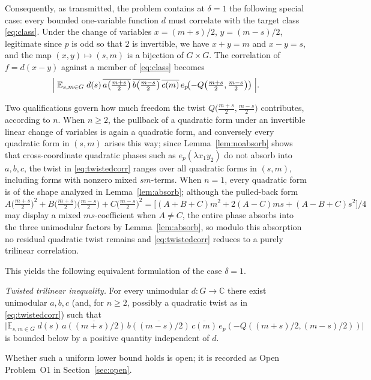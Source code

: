 \documentclass[11pt]{article}
\theoremstyle{remark}
\begin{document}
Consequently, as transmitted, the problem contains at $\delta=1$ the
following special case: every bounded one-variable function $d$ must
correlate with the target class \eqref{eq:class}. Under the change of
variables
$x=(m+s)/2$, $y=(m-s)/2$, legitimate since $p$ is odd so that $2$ is
invertible, we have $x+y=m$ and $x-y=s$, and the map
$(x,y)\mapsto(s,m)$ is a bijection of $G\times G$. The correlation of
$f=d(x-y)$ against a member of \eqref{eq:class} becomes
\begin{equation}\label{eq:twistedcorr}
\Bigl|\;
\mathbb{E}_{s,m\in G}\;
d(s)\,
\overline{a\bigl(\tfrac{m+s}{2}\bigr)}\,
\overline{b\bigl(\tfrac{m-s}{2}\bigr)}\,
\overline{c(m)}\,
e_p\!\bigl(-Q\bigl(\tfrac{m+s}{2},\tfrac{m-s}{2}\bigr)\bigr)
\;\Bigr|.
\end{equation}

Two qualifications govern how much freedom the twist
$Q\bigl(\tfrac{m+s}{2},\tfrac{m-s}{2}\bigr)$ contributes, according to $n$.
When $n\ge2$, the pullback of a quadratic form under an invertible linear
change of variables is again a quadratic form, and conversely every
quadratic form in $(s,m)$ arises this way; since
Lemma~\ref{lem:noabsorb} shows that cross-coordinate quadratic phases such
as $e_p(\lambda x_1y_2)$ do not absorb into $a,b,c$, the twist in
\eqref{eq:twistedcorr} ranges over all quadratic forms in $(s,m)$, including
forms with nonzero mixed $sm$-terms. When $n=1$, every quadratic form is of
the shape analyzed in Lemma~\ref{lem:absorb}; although the pulled-back form
$A\bigl(\tfrac{m+s}{2}\bigr)^2+B\bigl(\tfrac{m+s}{2}\bigr)
\bigl(\tfrac{m-s}{2}\bigr)+C\bigl(\tfrac{m-s}{2}\bigr)^2
=\bigl[(A{+}B{+}C)m^2+2(A{-}C)ms+(A{-}B{+}C)s^2\bigr]/4$
may display a mixed $ms$-coefficient when $A\ne C$, the entire phase absorbs
into the three unimodular factors by Lemma~\ref{lem:absorb}, so modulo this
absorption no residual quadratic twist remains and \eqref{eq:twistedcorr}
reduces to a purely trilinear correlation.

This yields the following equivalent formulation of the case $\delta=1$.

\emph{Twisted trilinear inequality.} For every unimodular $d:G\to\mathbb{C}$
there exist unimodular $a,b,c$ (and, for $n\ge2$, possibly a quadratic twist
as in \eqref{eq:twistedcorr}) such that
\[
\bigl|\mathbb{E}_{s,m\in G}\;
d(s)\,\overline{a((m+s)/2)}\,\overline{b((m-s)/2)}\,\overline{c(m)}\,
e_p(-Q((m+s)/2,(m-s)/2))\bigr|
\]
is bounded below by a positive quantity independent of $d$.

\noindent
Whether such a uniform lower bound holds is open; it is recorded as
Open Problem~O1 in Section~\ref{sec:open}.
\end{document}

